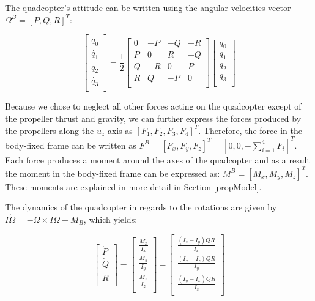 The quadcopter's attitude can be written using the angular velocities vector $\Omega^{B}=[P, Q, R]^{T}$:

\begin{equation}
\label{S7}
 \begin{bmatrix}
 	\dot{q_{0}} \\
 	\dot{q_{1}}\\
 	\dot{q_{2}} \\
 	\dot{q_{3}} \\
 	\end{bmatrix}=\frac{1}{2}\begin{bmatrix}
 	0 & -P & -Q & -R \\
 	P & 0 & R & -Q \\
 	Q & -R & 0 & P \\
 	R & Q & -P & 0 \\
 	\end{bmatrix}\begin{bmatrix}
 	q_{0} \\
 	q_{1}\\
 	q_{2} \\
 	q_{3} \\
\end{bmatrix}
\end{equation}

Because we chose to neglect all other forces acting on the quadcopter except of the propeller thrust and gravity, we can further express the forces produced by the propellers along the $u_{z}$ axis as $[F_{1}, F_{2}, F_{3}, F_{4}]^{T}$. Therefore, the force in the body-fixed frame can be written as $F^{B}=[F_{x}, F_{y}, F_{z}]^{T}=[0, 0, -\sum\limits_{i=1}^4 F_{i}]^{T}$. Each force produces a moment around the axes of the quadcopter and as a result the moment in the body-fixed frame can be expressed as: $M^{B}=[M_{x}, M_{y}, M_{z}]^{T}$. These moments are explained in more detail in Section \ref{propModel}.

The dynamics of the quadcopter in regards to the rotations are given by $I\dot{\Omega}=-\Omega\times I \Omega+M_{B}$, which yields:

\begin{equation}
\label{S8}
 \begin{bmatrix}
 	\dot{P} \\
 	\dot{Q} \\
 	\dot{R} \\
 	\end{bmatrix}=\begin{bmatrix}
 	\frac{M_{x}}{I_{x}}  \\
 	\frac{M_{y}}{I_{y}}  \\
 	\frac{M_{z}}{I_{z}}  \\
 	\end{bmatrix}-\begin{bmatrix}
 	\frac{(I_{z}-I_{y})QR}{I_{x}} \\
 	\frac{(I_{x}-I_{z})QR}{I_{y}} \\
 	\frac{(I_{y}-I_{x})QR}{I_{z}} \\
\end{bmatrix}
\end{equation}
 	 
